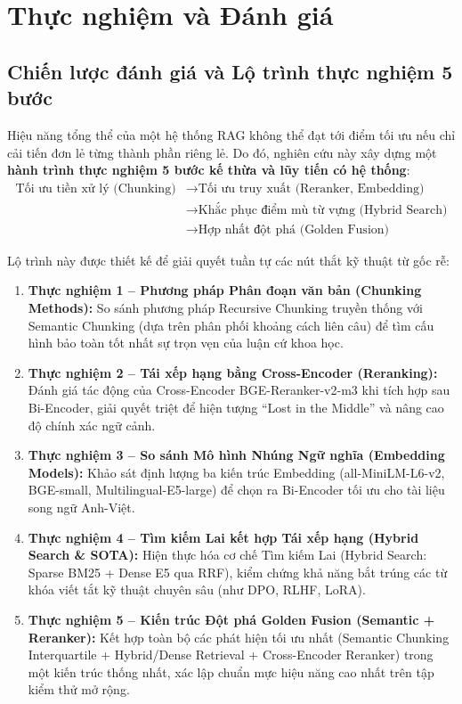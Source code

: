 ﻿\documentclass[12pt]{article}
\begin{document}
\section{Thực nghiệm và Đánh giá}

\subsection{Chiến lược đánh giá và Lộ trình thực nghiệm 5 bước}

Hiệu năng tổng thể của một hệ thống RAG không thể đạt tới điểm tối ưu nếu chỉ cải tiến đơn lẻ từng thành phần riêng lẻ. Do đó, nghiên cứu này xây dựng một \textbf{hành trình thực nghiệm 5 bước kế thừa và lũy tiến có hệ thống}:
\begin{equation}
    \begin{aligned}
        \text{Tối ưu tiền xử lý (Chunking)} &\longrightarrow \text{Tối ưu truy xuất (Reranker, Embedding)} \\
        &\longrightarrow \text{Khắc phục điểm mù từ vựng (Hybrid Search)} \\
        &\longrightarrow \text{Hợp nhất đột phá (Golden Fusion)}
    \end{aligned}
\end{equation}

Lộ trình này được thiết kế để giải quyết tuần tự các nút thắt kỹ thuật từ gốc rễ:
\begin{enumerate}[(1)]
    \item \textbf{Thực nghiệm 1 -- Phương pháp Phân đoạn văn bản (Chunking Methods):} So sánh phương pháp Recursive Chunking truyền thống với Semantic Chunking (dựa trên phân phối khoảng cách liên câu) để tìm cấu hình bảo toàn tốt nhất sự trọn vẹn của luận cứ khoa học.
    \item \textbf{Thực nghiệm 2 -- Tái xếp hạng bằng Cross-Encoder (Reranking):} Đánh giá tác động của Cross-Encoder BGE-Reranker-v2-m3 khi tích hợp sau Bi-Encoder, giải quyết triệt để hiện tượng ``Lost in the Middle'' và nâng cao độ chính xác ngữ cảnh.
    \item \textbf{Thực nghiệm 3 -- So sánh Mô hình Nhúng Ngữ nghĩa (Embedding Models):} Khảo sát định lượng ba kiến trúc Embedding (all-MiniLM-L6-v2, BGE-small, Multilingual-E5-large) để chọn ra Bi-Encoder tối ưu cho tài liệu song ngữ Anh-Việt.
    \item \textbf{Thực nghiệm 4 -- Tìm kiếm Lai kết hợp Tái xếp hạng (Hybrid Search \& SOTA):} Hiện thực hóa cơ chế Tìm kiếm Lai (Hybrid Search: Sparse BM25 + Dense E5 qua RRF), kiểm chứng khả năng bắt trúng các từ khóa viết tắt kỹ thuật chuyên sâu (như DPO, RLHF, LoRA).
    \item \textbf{Thực nghiệm 5 -- Kiến trúc Đột phá Golden Fusion (Semantic + Reranker):} Kết hợp toàn bộ các phát hiện tối ưu nhất (Semantic Chunking Interquartile + Hybrid/Dense Retrieval + Cross-Encoder Reranker) trong một kiến trúc thống nhất, xác lập chuẩn mực hiệu năng cao nhất trên tập kiểm thử mở rộng.
\end{enumerate}
\end{document}
